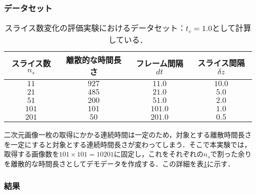     \subsubsection{データセット}

    \begin{table}[t]
        \centering
        \caption[スライス数変化の評価実験におけるデータセット]{スライス数変化の評価実験におけるデータセット：$t_c = 1.0$として計算している．}
        \label{tab:ns_exp_detail}
        \begin{tabular}{c|ccc}
            スライス数$n_s$ & 離散的な時間長さ & フレーム間隔$dt$ & スライス間隔$\delta z$ 
            \\ \hline \hline
            $11$ & $927$ & $11.0$ & $10.0$
            \\ $21$ & $485$ & $21.0$ & $5.0$
            \\ $51$ & $200$ & $51.0$ & $2.0$
            \\ $101$ & $101$ & $101.0$ & $1.0$
            \\ $201$ & $50$ & $201.0$ & $0.5$
        \end{tabular}
    \end{table}

    二次元画像一枚の取得にかかる連続時間は一定のため，対象とする離散時間長さを一定にすると対象とする連続時間長さが変わってしまう．そこで本実験では，取得する画像数を$101 \times 101 = 10201$に固定し，これをそれぞれの$n_s$で割った余りを離散的な時間長さとしてデモデータを作成する．この詳細を表\ref{tab:ns_exp_detail}に示す．

    \subsubsection{結果}

